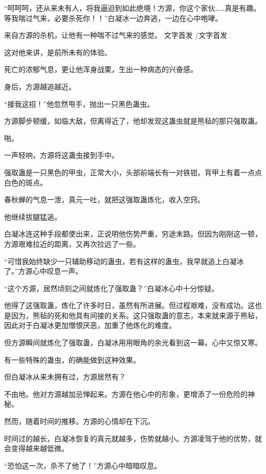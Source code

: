 
\begin{this_body}

“呵呵呵，还从来未有人，将我逼迫到如此绝境！方源，你这个家伙……真是有趣。等我喘过气来，必要杀死你！！”白凝冰一边奔逃，一边在心中咆哮。

来自方源的杀机，让他有一种喘不过气来的感觉。 文字首发 /文字首发

这对他来讲，是前所未有的体验。

死亡的浓郁气息，更让他浑身战栗，生出一种病态的兴奋感。

身后，方源越追越近。

“接我这招！”他忽然甩手，抛出一只黑色蛊虫。

方源脚步顿缓，如临大敌，但离得近了，他却发现这蛊虫就是熊毡的那只强取蛊。

啪。

一声轻响，方源将这蛊虫接到手中。

强取蛊是一只黑色的甲虫，正常大小，头部前端长有一对铁钳。背甲上有着一点点白色的斑点。

春秋蝉的气息一泄，真元一吐，就把这强取蛊炼化，收入空窍。

他继续拔腿猛追。

白凝冰连这种手段都使出来，正说明他伤势严重，穷途末路。但因为刚刚这一顿，方源艰难拉近的距离，又再次拉远了一些。

“可惜我始终缺少一只辅助移动的蛊虫，若有这样的蛊虫，我早就追上白凝冰了。”方源心中叹息一声。

“这个方源，居然顷刻之间就炼化了强取蛊？”白凝冰心中十分惊疑。

他得了这强取蛊，炼化了许多时日，虽然有所进展。但过程艰难，没有成功。这也是因为，熊毡的死和他具有间接的关系。这只强取蛊的意志，本来就来源于熊毡，因此对于白凝冰更加憎恨厌恶，加重了他炼化的难度。

但方源瞬间就炼化了强取蛊，白凝冰用用眼角的余光看到这一幕。心中又惊又寒。

有一些特殊的蛊虫，的确能做到这种效果。

但白凝冰从来未拥有过，方源居然有？

不由地。他对方源越加忌惮起来。方源在他心中的形象，更增添了一份危险的神秘。

然而，随着时间的推移。方源的心情却在下沉。

时间过的越长，白凝冰恢复的真元就越多，伤势就越小。方源凌驾于他的优势，就会变得越来越低微。

“恐怕这一次，杀不了他了！”方源心中暗暗叹息。


\end{this_body}
